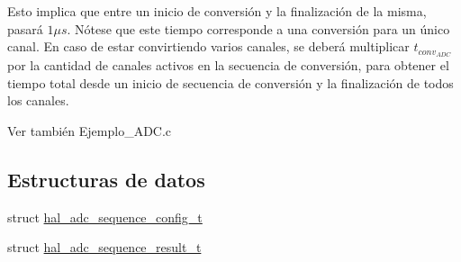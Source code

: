 Esto implica que entre un inicio de conversión y la finalización de la misma, pasará $1 \mu s$. Nótese que este tiempo corresponde a una conversión para un único canal. En caso de estar convirtiendo varios canales, se deberá multiplicar $ t_{conv_{ADC}} $ por la cantidad de canales activos en la secuencia de conversión, para obtener el tiempo total desde un inicio de secuencia de conversión y la finalización de todos los canales.

\begin{DoxySeeAlso}{Ver también}
Ejemplo\+\_\+\+A\+D\+C.\+c 
\end{DoxySeeAlso}
\subsection*{Estructuras de datos}
\begin{DoxyCompactItemize}
\item 
struct \hyperlink{structhal__adc__sequence__config__t}{hal\+\_\+adc\+\_\+sequence\+\_\+config\+\_\+t}
\item 
struct \hyperlink{group__ADC_structhal__adc__sequence__result__t}{hal\+\_\+adc\+\_\+sequence\+\_\+result\+\_\+t}
\end{DoxyCompactItemize}
